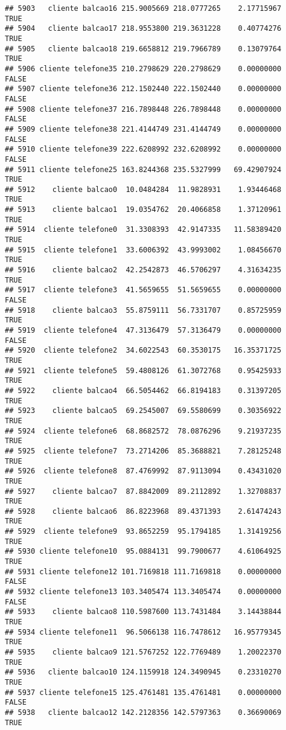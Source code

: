\documentclass[
]{article}
\begin{document}
\begin{verbatim}
## 5903   cliente balcao16 215.9005669 218.0777265    2.17715967     TRUE
## 5904   cliente balcao17 218.9553800 219.3631228    0.40774276     TRUE
## 5905   cliente balcao18 219.6658812 219.7966789    0.13079764     TRUE
## 5906 cliente telefone35 210.2798629 220.2798629    0.00000000    FALSE
## 5907 cliente telefone36 212.1502440 222.1502440    0.00000000    FALSE
## 5908 cliente telefone37 216.7898448 226.7898448    0.00000000    FALSE
## 5909 cliente telefone38 221.4144749 231.4144749    0.00000000    FALSE
## 5910 cliente telefone39 222.6208992 232.6208992    0.00000000    FALSE
## 5911 cliente telefone25 163.8244368 235.5327999   69.42907924     TRUE
## 5912    cliente balcao0  10.0484284  11.9828931    1.93446468     TRUE
## 5913    cliente balcao1  19.0354762  20.4066858    1.37120961     TRUE
## 5914  cliente telefone0  31.3308393  42.9147335   11.58389420     TRUE
## 5915  cliente telefone1  33.6006392  43.9993002    1.08456670     TRUE
## 5916    cliente balcao2  42.2542873  46.5706297    4.31634235     TRUE
## 5917  cliente telefone3  41.5659655  51.5659655    0.00000000    FALSE
## 5918    cliente balcao3  55.8759111  56.7331707    0.85725959     TRUE
## 5919  cliente telefone4  47.3136479  57.3136479    0.00000000    FALSE
## 5920  cliente telefone2  34.6022543  60.3530175   16.35371725     TRUE
## 5921  cliente telefone5  59.4808126  61.3072768    0.95425933     TRUE
## 5922    cliente balcao4  66.5054462  66.8194183    0.31397205     TRUE
## 5923    cliente balcao5  69.2545007  69.5580699    0.30356922     TRUE
## 5924  cliente telefone6  68.8682572  78.0876296    9.21937235     TRUE
## 5925  cliente telefone7  73.2714206  85.3688821    7.28125248     TRUE
## 5926  cliente telefone8  87.4769992  87.9113094    0.43431020     TRUE
## 5927    cliente balcao7  87.8842009  89.2112892    1.32708837     TRUE
## 5928    cliente balcao6  86.8223968  89.4371393    2.61474243     TRUE
## 5929  cliente telefone9  93.8652259  95.1794185    1.31419256     TRUE
## 5930 cliente telefone10  95.0884131  99.7900677    4.61064925     TRUE
## 5931 cliente telefone12 101.7169818 111.7169818    0.00000000    FALSE
## 5932 cliente telefone13 103.3405474 113.3405474    0.00000000    FALSE
## 5933    cliente balcao8 110.5987600 113.7431484    3.14438844     TRUE
## 5934 cliente telefone11  96.5066138 116.7478612   16.95779345     TRUE
## 5935    cliente balcao9 121.5767252 122.7769489    1.20022370     TRUE
## 5936   cliente balcao10 124.1159918 124.3490945    0.23310270     TRUE
## 5937 cliente telefone15 125.4761481 135.4761481    0.00000000    FALSE
## 5938   cliente balcao12 142.2128356 142.5797363    0.36690069     TRUE

\end{verbatim}
\end{document}
